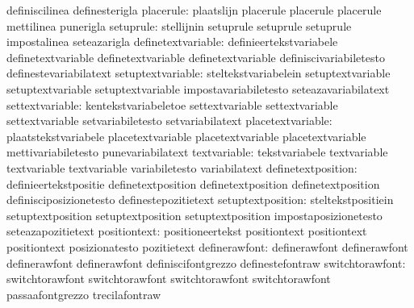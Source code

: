                                  definiscilinea                   definesterigla
                       placerule: plaatslijn                       placerule
                                  placerule                        placerule
                                  mettilinea                       punerigla
                       setuprule: stellijnin                       setuprule
                                  setuprule                        setuprule
                                  impostalinea                     seteazarigla
              definetextvariable: definieertekstvariabele          definetextvariable
                                  definetextvariable               definetextvariable
                                  definiscivariabiletesto          definestevariabilatext
               setuptextvariable: steltekstvariabelein             setuptextvariable
                                  setuptextvariable                setuptextvariable
                                  impostavariabiletesto            seteazavariabilatext
                 settextvariable: kentekstvariabeletoe             settextvariable
                                  settextvariable                  settextvariable
                                  setvariabiletesto                setvariabilatext %
               placetextvariable: plaatstekstvariabele             placetextvariable
                                  placetextvariable                placetextvariable
                                  mettivariabiletesto              punevariabilatext
                    textvariable: tekstvariabele                   textvariable
                                  textvariable                     textvariable
                                  variabiletesto                   variabilatext
              definetextposition: definieertekstpositie            definetextposition
                                  definetextposition               definetextposition
                                  definisciposizionetesto          definestepozitietext
               setuptextposition: steltekstpositiein               setuptextposition
                                  setuptextposition                setuptextposition
                                  impostaposizionetesto            seteazapozitietext
                    positiontext: positioneertekst                 positiontext
                                  positiontext                     positiontext
                                  posizionatesto                   pozitietext %
                   definerawfont: definerawfont                    definerawfont
                                  definerawfont                    definerawfont
                                  definiscifontgrezzo              definestefontraw
                 switchtorawfont: switchtorawfont                  switchtorawfont
                                  switchtorawfont                  switchtorawfont
                                  passaafontgrezzo                 trecilafontraw
\stopcommands

